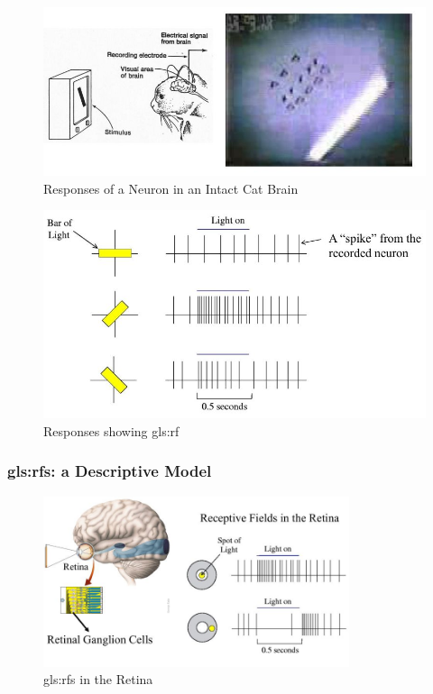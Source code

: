\documentclass[]{article}
\begin{document}
\begin{figure}[H]
	\caption[Responses of a Neuron in an Intact Cat Brain]{Responses of a Neuron in an Intact Cat Brain\cite{hubel1965receptive}}
	\includegraphics[width=\textwidth]{receptive-field-cat}
\end{figure}

\begin{figure}[H]
	\caption{Responses showing \gls{gls:rf}}
	\includegraphics[width=\textwidth]{receptive-field-cat-bars}
\end{figure}

\subsubsection{\Glspl{gls:rf}: a Descriptive Model}

\begin{figure}[H]
	\caption{\Glspl{gls:rf} in the Retina}
	\includegraphics[width=0.8\textwidth]{receptive-fields-in-the-retina}
\end{figure}
\end{document}
